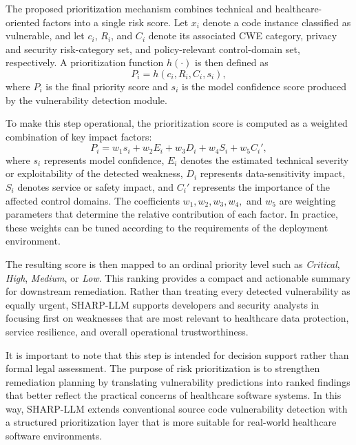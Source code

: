 \documentclass[conference]{IEEEtran}
\begin{document}
The proposed prioritization mechanism combines technical and healthcare-oriented factors into a single risk score. Let $x_i$ denote a code instance classified as vulnerable, and let $c_i$, $R_i$, and $C_i$ denote its associated CWE category, privacy and security risk-category set, and policy-relevant control-domain set, respectively. A prioritization function $h(\cdot)$ is then defined as
\begin{equation}
P_i = h(c_i, R_i, C_i, s_i),
\end{equation}
where $P_i$ is the final priority score and $s_i$ is the model confidence score produced by the vulnerability detection module.

To make this step operational, the prioritization score is computed as a weighted combination of key impact factors:
\begin{equation}
P_i = w_1 s_i + w_2 E_i + w_3 D_i + w_4 S_i + w_5 C_i',
\end{equation}
where $s_i$ represents model confidence, $E_i$ denotes the estimated technical severity or exploitability of the detected weakness, $D_i$ represents data-sensitivity impact, $S_i$ denotes service or safety impact, and $C_i'$ represents the importance of the affected control domains. The coefficients $w_1, w_2, w_3, w_4,$ and $w_5$ are weighting parameters that determine the relative contribution of each factor. In practice, these weights can be tuned according to the requirements of the deployment environment.

The resulting score is then mapped to an ordinal priority level such as \textit{Critical}, \textit{High}, \textit{Medium}, or \textit{Low}. This ranking provides a compact and actionable summary for downstream remediation. Rather than treating every detected vulnerability as equally urgent, SHARP-LLM supports developers and security analysts in focusing first on weaknesses that are most relevant to healthcare data protection, service resilience, and overall operational trustworthiness.

It is important to note that this step is intended for decision support rather than formal legal assessment. The purpose of risk prioritization is to strengthen remediation planning by translating vulnerability predictions into ranked findings that better reflect the practical concerns of healthcare software systems. In this way, SHARP-LLM extends conventional source code vulnerability detection with a structured prioritization layer that is more suitable for real-world healthcare software environments.
\end{document}
